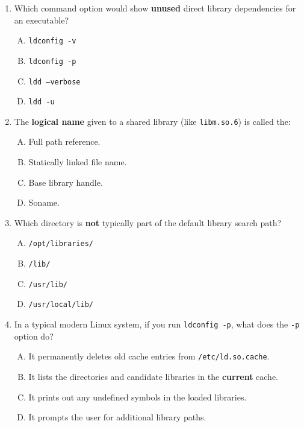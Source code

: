 \documentclass[a4paper]{report}
\begin{document}
\begin{enumerate}[1.]
    \item Which command option would show \textbf{unused} direct library dependencies for an executable?  
    \begin{enumerate}[A)]
        \item \texttt{ldconfig -v}  
        \item \texttt{ldconfig -p}  
        \item \texttt{ldd --verbose}  
        \item \texttt{ldd -u}  
    \end{enumerate}

    \item The \textbf{logical name} given to a shared library (like \texttt{libm.so.6}) is called the:  
    \begin{enumerate}[A)]
        \item Full path reference.  
        \item Statically linked file name.  
        \item Base library handle.  
        \item Soname.  
    \end{enumerate}

    \item Which directory is \textbf{not} typically part of the default library search path?  
    \begin{enumerate}[A)]
        \item \texttt{/opt/libraries/}  
        \item \texttt{/lib/}  
        \item \texttt{/usr/lib/}  
        \item \texttt{/usr/local/lib/}  
    \end{enumerate}

    \item In a typical modern Linux system, if you run \texttt{ldconfig -p}, what does the \texttt{-p} option do?  
    \begin{enumerate}[A)]
        \item It permanently deletes old cache entries from \texttt{/etc/ld.so.cache}.  
        \item It lists the directories and candidate libraries in the \textbf{current} cache.  
        \item It prints out any undefined symbols in the loaded libraries.  
        \item It prompts the user for additional library paths.  
    \end{enumerate}


\end{enumerate}
\end{document}
